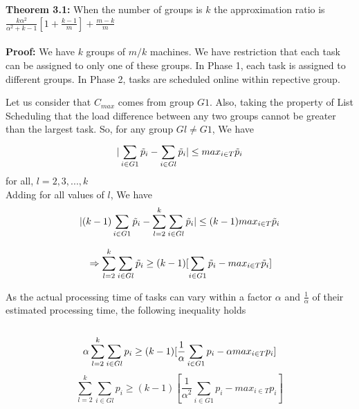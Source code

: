 \documentclass[10pt, conference, compsocconf]{IEEEtran}
\begin{document}
\textbf{Theorem 3.1:} When the number of groups is $k$ the approximation ratio is $  \frac{k\alpha^{2}}{\alpha^{2}+k-1}[1+ {\frac{k-1}{m}} ]+ {\frac{m-k}{m}}   $ \\
\\
\textbf{Proof:} 
  We have $k$ groups of $m/k$ machines. We have restriction that each task can be assigned to only one of these groups. In Phase 1, each task is assigned to different groups. In Phase 2, tasks are scheduled online within repective group.

Let us consider  that $ C_{max}$ comes from group  $G1$. Also, taking the property of List Scheduling that the load difference between any two groups cannot be greater than the largest task. So, for any group $Gl \neq G1$, We have\\

\begin{equation}{\nonumber}
|\sum_{i \in G1 }^{}{\tilde p_{i}}- \sum_{i \in Gl }^{}{\tilde p_{i}}| \leq {max_{i \in T}}{\tilde p_{i}}\end{equation}  \hspace*{15pt}   for all, $l = 2,3,...,k$ \\

Adding for all values of $l$, We have \\

\begin{equation}{\nonumber}
|(k-1)\sum_{i \in G1 }^{}{\tilde p_{i}}- \sum_{l=2}^{k}\sum_{i \in Gl }^{}{\tilde p_{i}}| \leq (k-1) {max_{i \in T}}{\tilde p_{i}}
\end{equation}

\begin{equation}{\nonumber}
\Rightarrow \sum_{l=2}^{k}\sum_{i \in Gl }^{}{\tilde p_{i}} \geq (k-1)[\sum_{i \in G1 }^{}{\tilde p_{i}}- {max_{i \in T}}{\tilde p_{i}}]
\end{equation}



As the actual processing time of tasks  can vary within a factor $\alpha$ and $\frac{1}{\alpha}$ of their estimated processing time, the following inequality holds\\
\\
\begin{equation}{\nonumber}
 \alpha\sum_{l=2}^{k}\sum_{i \in Gl }^{}{{p_{i}}} \geq (k-1)[\frac{1}{\alpha}\sum_{i \in G1 }^{}{{p_{i}}}- \alpha {max_{i \in T}}{{p_{i}}}]
\end{equation}
\begin{equation}
\sum_{l=2}^{k}\sum_{i \in Gl }^{}{{p_{i}}} \geq (k-1)[\frac{1}{\alpha^{2}}\sum_{i \in G1 }^{}{{p_{i}}}-  {max_{i \in T}}{{p_{i}}}]
\end{equation}
\end{document}
